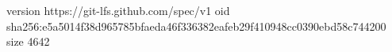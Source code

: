 version https://git-lfs.github.com/spec/v1
oid sha256:e5a5014f38d965785bfaeda46f336382eafeb29f410948cc0390ebd58c744200
size 4642
